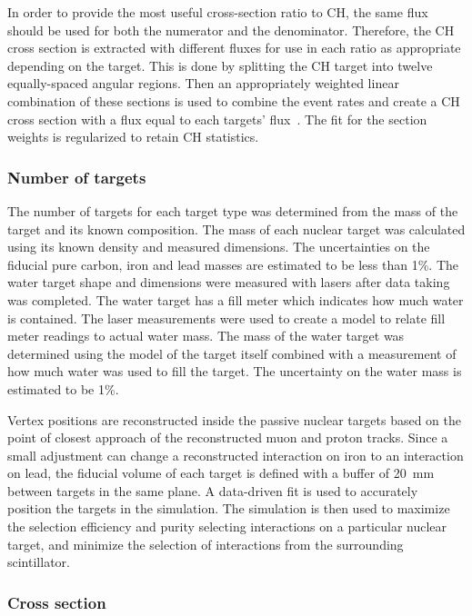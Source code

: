 \documentclass[aps,prd,twocolumn,showpacs,superscriptaddress,floatfix]{revtex4-2}  %
\begin{document}
In order to provide the most useful cross-section ratio to CH, the same flux should be used for both the numerator and the denominator. Therefore, the CH cross section is extracted with different fluxes for use in each ratio as appropriate depending on the target. This is done by splitting the CH target into twelve equally-spaced angular regions.  Then an appropriately weighted linear combination of these sections is used to combine the event rates and create a CH cross section with a flux equal to each targets' flux~\cite{jk_1trk_prl}.  The fit for the section weights is regularized to retain CH statistics.

\subsubsection{Number of targets}
\label{water-target-explanation}

The number of targets for each target type was determined from the mass of the target and its known composition.  The mass of each nuclear target was calculated using its known density and measured dimensions. The uncertainties on the fiducial pure carbon, iron and lead masses are estimated to be less than 1\%. The water target shape and dimensions were measured with lasers after data taking was completed. The water target has a fill meter which  
indicates how much water is contained. The laser measurements were used to create a model to relate fill meter readings to actual water mass. 
The mass of the water target 
was determined using the model of the target itself combined with a measurement of how much water was used to fill the target.
The uncertainty on the water mass is estimated to be 1\%. 

Vertex positions are reconstructed inside the passive nuclear targets based on the point of closest approach of the reconstructed muon and proton tracks. Since a small adjustment can change a reconstructed interaction on iron to an interaction on lead, the fiducial volume of each target is defined with a buffer of 20~mm between targets in the same plane. A data-driven fit is used to accurately position the targets in the simulation. The simulation is then used to maximize the selection efficiency and purity selecting interactions on a particular nuclear target, and minimize the selection of interactions from the surrounding scintillator.

\subsubsection{Cross section}
\end{document}
